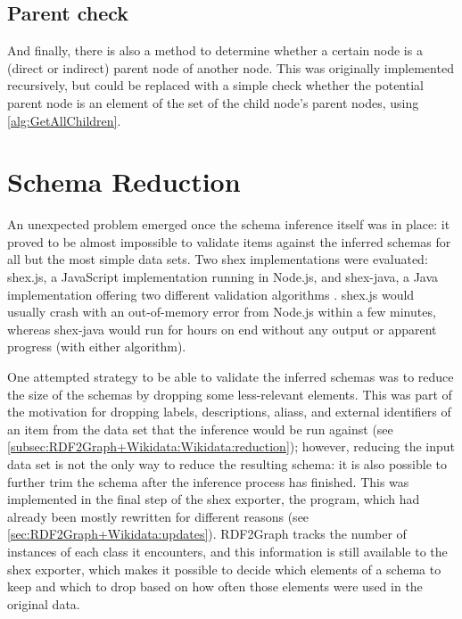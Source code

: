 \subsection{Parent check}
\label{subsec:RDF2Graph+Wikidata:cyclic-graph:IsParent}

And finally, there is also a method to determine whether a certain node is a (direct or indirect) parent node of another node.
This was originally implemented recursively,
but could be replaced with a simple check whether the potential parent node is an element of the set of the child node’s parent nodes,
using \cref{alg:GetAllChildren}.

\section{Schema Reduction}
\label{sec:RDF2Graph+Wikidata:schema-reduction}

An unexpected problem emerged once the \gls{schema} inference itself was in place: %
it proved to be almost impossible to validate \glspl{item} against the inferred \glspl{schema}
for all but the most simple data sets.
Two \gls{shex} implementations were evaluated:
shex.js, %
a \gls{JavaScript} implementation running in \gls{Node.js},
and shex-java,
a Java implementation offering two different validation algorithms \cite{boneva:hal-01590350}.
shex.js would usually crash with an out-of-memory error from \gls{Node.js} within a few minutes,
whereas shex-java would run for hours on end without any output or apparent progress
(with either algorithm).

One attempted strategy to be able to validate the inferred \glspl{schema} %
was to reduce the size of the \glspl{schema} by dropping some less-relevant elements.
This was part of the motivation for dropping \glspl{label}, \glspl{description}, \glspl{alias}, and external identifiers of an \gls{item}
from the data set that the inference would be run against
(see \cref{subsec:RDF2Graph+Wikidata:Wikidata:reduction});
however, reducing the input data set is not the only way to reduce the resulting \gls{schema}:
it is also possible to further trim the \gls{schema} after the inference process has finished.
This was implemented in the final step of the \gls{shex} exporter,
the  program,
which had already been mostly rewritten for different reasons
(see \cref{sec:RDF2Graph+Wikidata:updates}).
\Gls{RDF2Graph} tracks the number of instances of each class it encounters,
and this information is still available to the \gls{shex} exporter,
which makes it possible to decide which elements of a \gls{schema} to keep and which to drop
based on how often those elements were used in the original data. %

